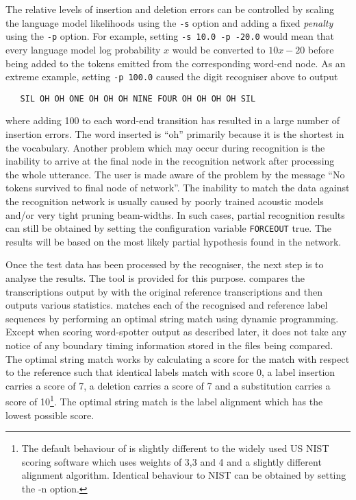 The relative levels of insertion 
and deletion errors
 can be controlled
by scaling the language model likelihoods using the \texttt{-s} option
and adding a fixed \textit{penalty}   using the \texttt{-p} option.
For example, setting \texttt{-s 10.0 -p -20.0} would mean that every language
model log probability $x$ would be converted to $10x - 20$ before being
added to the tokens emitted from the corresponding word-end node. As
an extreme example, setting \texttt{-p 100.0}
caused the digit recogniser above to output
\begin{verbatim}
   SIL OH OH ONE OH OH OH NINE FOUR OH OH OH OH SIL 
\end{verbatim}
where adding 100 to each word-end transition has resulted in a large number of
insertion errors.  The word inserted is ``oh'' primarily because it is the
shortest in the vocabulary. 
Another problem which may occur during recognition is the inability to arrive
at the final node in the recognition network after processing the whole
utterance.  The user is made aware of the
problem by the message ``No tokens survived to final node of network''. The
inability to match the data against the recognition network is usually caused
by poorly trained acoustic models and/or very tight pruning beam-widths. In
such cases, partial recognition results can still be obtained by setting the
 configuration variable \texttt{FORCEOUT} true. 
 The results will be based on the most likely partial 
hypothesis found in the network.


Once the test data has been processed by the recogniser, the next step is to
analyse the results. The tool 
 is provided for this purpose.  compares 
the transcriptions output by  with the original reference
transcriptions and then outputs various statistics.  matches
each of the recognised and reference label sequences by performing an optimal
string match using dynamic programming. Except when
scoring word-spotter output as described later, it does not take any notice of
any boundary timing information stored in the files being compared.  The
optimal string match works by calculating a score for the match with respect to
the reference such that identical labels match with score 0, a label insertion
carries a score of 7, a deletion carries a score of 7 and a substitution
carries a score of 10\footnote{The default behaviour of  is
slightly different to the widely used US NIST scoring software which uses
weights of 3,3 and 4 and a slightly different alignment algorithm. Identical
behaviour to NIST can be obtained by setting the -n option.}. The optimal
string match is the label alignment which has the lowest possible score.

